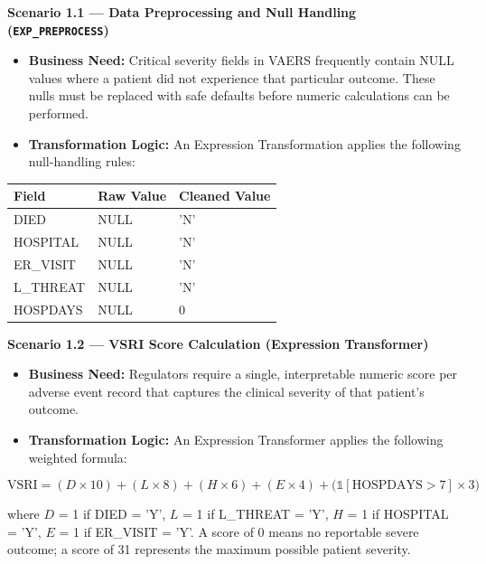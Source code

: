 \documentclass[12pt,a4paper]{report}
\begin{document}
\bigskip

\noindent\textbf{Scenario 1.1 — Data Preprocessing and Null Handling (\texttt{EXP\_PREPROCESS})}

\begin{itemize}[leftmargin=*]
  \item \textbf{Business Need:} Critical severity fields in VAERS frequently contain NULL values where a patient did not experience that particular outcome. These nulls must be replaced with safe defaults before numeric calculations can be performed.
  \item \textbf{Transformation Logic:} An Expression Transformation applies the following null-handling rules:
\end{itemize}

\begin{center}
\begin{tabular}{lll}
\toprule
\textbf{Field}   & \textbf{Raw Value} & \textbf{Cleaned Value} \\
\midrule
DIED      & NULL & 'N' \\
HOSPITAL  & NULL & 'N' \\
ER\_VISIT & NULL & 'N' \\
L\_THREAT & NULL & 'N' \\
HOSPDAYS  & NULL & 0   \\
\bottomrule
\end{tabular}
\end{center}

\bigskip

\noindent\textbf{Scenario 1.2 — VSRI Score Calculation (Expression Transformer)}

\begin{itemize}[leftmargin=*]
  \item \textbf{Business Need:} Regulators require a single, interpretable numeric score per adverse event record that captures the clinical severity of that patient's outcome.
  \item \textbf{Transformation Logic:} An Expression Transformer applies the following weighted formula:
\end{itemize}

\[
\text{VSRI} = (D \times 10) + (L \times 8) + (H \times 6) + (E \times 4) + \bigl(\mathbb{1}[\text{HOSPDAYS} > 7] \times 3\bigr)
\]

where $D$ = 1 if DIED = 'Y', $L$ = 1 if L\_THREAT = 'Y', $H$ = 1 if HOSPITAL = 'Y', $E$ = 1 if ER\_VISIT = 'Y'. A score of 0 means no reportable severe outcome; a score of 31 represents the maximum possible patient severity.
\end{document}

